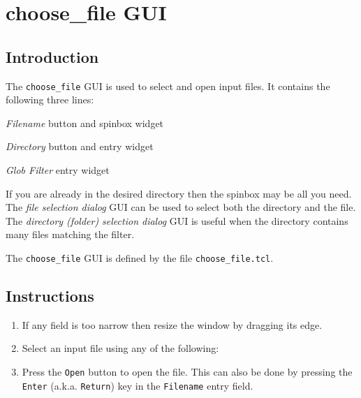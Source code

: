 
\section{choose\_file GUI}
    \label{choose-file}

  \subsection{Introduction}
    \label{choose-file-Introduction}

The 
  \texttt{choose\_file} GUI is used to select and open input files.
  It contains the following three lines:
\begin{bullets}
    \item 
    \emph{Filename} button and spinbox widget
    \item 
    \emph{Directory} button and entry widget
    \item 
    \emph{Glob Filter} entry widget
\end{bullets}
If you are already in the desired directory then the spinbox may
  be all you need. The 
  \emph{file selection dialog} GUI can be used to select both the
  directory and the file. The 
  \emph{directory (folder) selection dialog} GUI is useful when the
  directory contains many files matching the filter.
  
The 
  \texttt{choose\_file} GUI is defined by the file 
  \texttt{choose\_file.tcl}.

  \subsection{Instructions}
    \label{choose-file-Instructions}

  \begin{enumerate}
    \item If any field is too narrow then resize the window by dragging
    its edge.
    \item Select an input file using any of the following:
    \item Press the \texttt{Open} button to open the file. This can also be done by pressing the 
	  \texttt{Enter} (a.k.a.  \texttt{Return}) key in the \texttt{Filename} entry field.
  \end{enumerate}

